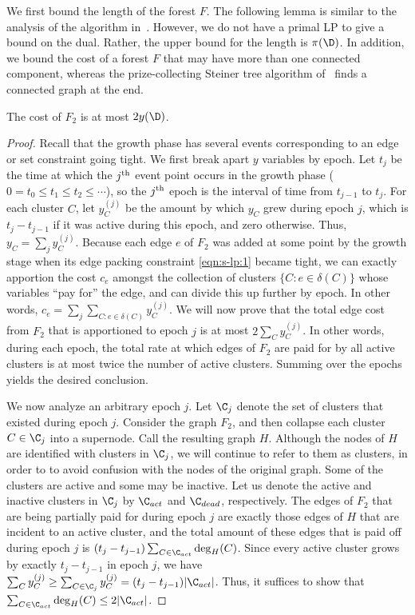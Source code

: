 We first bound the length of the forest $F$.
The following lemma is similar to the analysis of the algorithm in~\cite{GW95}.
However, we do not have a primal LP to give a bound on the dual.
Rather, the upper bound for the length is $\pi(\D)$.
In addition, we bound the cost of a forest $F$ that may have
more than one connected component, whereas the prize-collecting Steiner tree
algorithm of~\cite{GW95} finds a connected graph at the end.
\begin{lemma}\label{lem:submod-growth:cost}
 The cost of $F_2$ is at most $2y(\D)$.
\end{lemma}

\begin{proof}
Recall that the growth phase has several events corresponding to an edge or set constraint going tight.
We first break apart $y$ variables by epoch.  Let $t_j$ be the
  time at which the $j^{\rm th}$ event point occurs in the growth phase ($0=t_0\leq t_1 \leq t_2 \leq \cdots$), so the $j^{\rm th}$ epoch is the interval of time from $t_{j-1}$ to $t_j$.  For each cluster $C$, let $y_{C}^{(j)}$  be the amount by which $y_C$ grew during epoch $j$, which is  $t_j-t_{j-1}$ if it was active during this epoch, and zero otherwise.  Thus, $y_C = \sum_j y_{C}^{(j)}$.
Because each edge $e$ of $F_2$
  was added at some point by the growth stage when its edge packing constraint \eqref{eqn:s-lp:1} became tight, we can exactly apportion the cost
  $c_e$ amongst the collection of clusters $\{C : e\in \delta(C)\}$ whose
  variables ``pay for'' the edge, and can divide this up further
  by epoch.  In other words, $c_e = \sum_j \sum_{C:e\in \delta(C)}
  y_{C}^{(j)}$.  We will now prove that the total edge cost from $F_2$
  that is apportioned to epoch $j$ is at most $2 \sum_{C} y_{C}^{(j)}$.  In other words, during each epoch,
  the total rate at which edges of $F_2$ are paid for by all active
  clusters is at most twice the number of active clusters.
  Summing over the epochs yields the desired conclusion.

  We now analyze an arbitrary epoch $j$.  Let $\C_j$ denote the set
  of clusters that existed during epoch $j$.
Consider the graph $F_2$, and then collapse each cluster
  $C \in \C_j$ into a supernode.  Call the resulting graph $H$.
Although the nodes of
  $H$ are identified with clusters in $\C_j$, we will continue to refer
  to them as clusters, in order to to avoid confusion with the nodes of
  the original graph.  Some of the clusters are active and some may be
  inactive.  Let us denote the active and inactive clusters in $\C_j$
  by $\C_{act}$ and $\C_{dead}$, respectively.
  The edges of $F_2$ that are being partially paid for during epoch $j$
  are exactly those edges of $H$ that are incident to an active cluster,
  and the total amount of these edges that is paid off during epoch
  $j$ is $(t_j-t_{j-1}) \sum_{C \in \C_{act}} \deg_H(C)$.
  Since every active cluster grows by exactly $t_j-t_{j-1}$ in epoch
  $j$, we have $\sum_{C} y_{C}^{(j)} \geq \sum_{C \in\C_j}y_{C}^{(j)} = (t_j-t_{j-1}) |\C_{act}|$. Thus, it suffices to show that $\sum_{C
    \in \C_{act}} \deg_H(C) \leq 2 |\C_{act}|$.






\end{proof}
